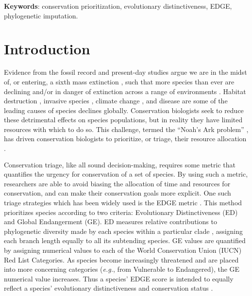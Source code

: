 \documentclass[12pt,english]{article}
\begin{document}
\textbf{Keywords}: conservation prioritization, evolutionary
distinctiveness, EDGE, phylogenetic imputation.

\clearpage
\section*{Introduction}

Evidence from the fossil record and present-day studies argue we are in the
midst of, or entering, a sixth mass extinction \autocite{Barnosky2011,
Ceballos2015}, such that more species than ever are declining and/or in danger
of extinction across a range of environments \autocite{Wake2008,Thomas2004}.
Habitat destruction \autocite{Brooks2002}, invasive species
\autocite{Molnar2008}, climate change \autocite{Pounds2006}, and disease
\autocite{Lips2006} are some of the leading causes of species declines globally.
Conservation biologists seek to reduce these detrimental effects on species
populations, but in reality they have limited resources with which to do so.
This challenge, termed the ``Noah's Ark problem'' \autocite{Weitzman1998}, has
driven conservation biologists to prioritize, or triage, their resource allocation
\autocite{Bottrill2008}.

Conservation triage, like all sound decision-making, requires some metric that
quantifies the urgency for conservation of a set of species. By using such a
metric, researchers are able to avoid biasing the allocation of time and
resources for conservation, and can make their conservation goals more explicit.
One such triage strategies which has been widely used is the EDGE metric
\autocite[Evolutionary Distinction and Globally Endangered;][]{Isaac2007}. This
method prioritizes species according to two criteria: Evolutionary
Distinctiveness (ED) and Global Endangerment (GE). ED measures relative
contributions to phylogenetic diversity made by each species within a particular
clade \autocite{Isaac2007}, assigning each branch length equally to all its
subtending species. GE values are quantified by assigning numerical values to
each of the World Conservation Union (IUCN) Red List Categories. As species
become increasingly threatened and are placed into more concerning categories
(\emph{e.g.}, from Vulnerable to Endangered), the GE numerical value increases.
Thus a species' EDGE score is intended to equally reflect a species' evolutionary
distinctiveness and conservation status \autocite[even if it does not always in practice; see][]{Pearse2015}.
\end{document}
